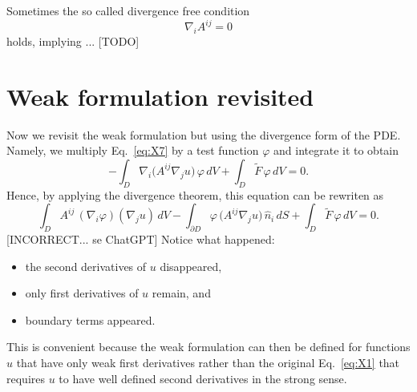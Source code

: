 \documentclass[aps,prl,twocolumn,groupedaddress]{revtex4-2}
\begin{document}
Sometimes the so called divergence free condition
$$
\nabla_i A^{ij} = 0
$$
holds, implying ...
{\color{red}[TODO]}

\section{Weak formulation revisited}


Now we revisit the weak formulation but using the divergence form of the PDE.
Namely, we multiply Eq.~\ref{eq:X7} by a test function $\varphi$ and integrate it to obtain
$$
-
\int_D
\nabla_i
\big(
A^{ij}
\nabla_j
u
\big)\,
\varphi\,
dV
+
\int_D
\tilde{F}\,
\varphi\,
dV
=
0
.
$$
Hence, by applying the divergence theorem, this equation can be rewriten as
$$
\int_D
A^{ij}\,
(\nabla_i \varphi)
(\nabla_j u)
\,
dV
-
\int_{\partial D}
\varphi\,
\big(
A^{ij}
\nabla_j
u
\big)\,
\hat{n}_i\,
dS
+
\int_D
\tilde{F}\,
\varphi\,
dV
=
0
.
$$
{\color{red}[INCORRECT... se ChatGPT]}
Notice what happened:
\begin{itemize}
\item the second derivatives of $u$ disappeared,
\item only first derivatives of $u$ remain, and
\item boundary terms appeared.
\end{itemize}
This is convenient because the weak formulation can then be defined for functions $u$ that have only weak first derivatives rather than the original Eq.~\ref{eq:X1} that requires $u$ to have well defined second derivatives in the strong sense.
\end{document}
